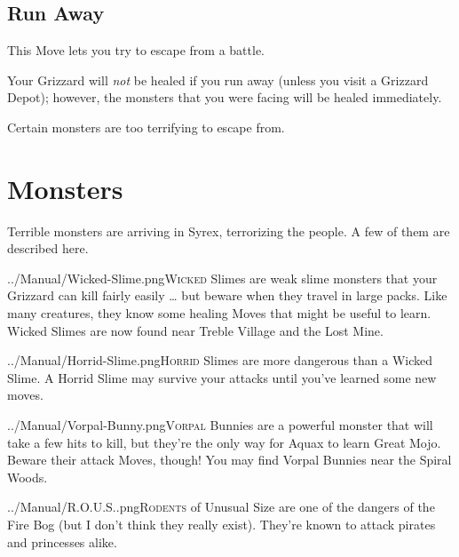 \documentclass[10pt,twocolumn,openany,article]{memoir}
\begin{document}
\begin{description}
\fi

\section{Run Away}

This Move lets you try to escape from a battle.

Your Grizzard  will \emph{not}  be healed  if you  run away  (unless you
visit a Grizzard Depot); however, the monsters that you were facing will
be healed immediately.

Certain monsters are too terrifying to escape from.


\chapter{Monsters}

Terrible monsters are  arriving in Syrex, terrorizing the  people. A few
of them are described here.

\vspace{14pt}

\lettrine[image=true,       lines=5, findent=3pt, nindent=3pt]{../Manual/Wicked-Slime.png}{Wicked}
Slimes are weak slime monsters that your Grizzard can kill fairly easily
… but beware when they travel  in large packs. Like many creatures, they
know some healing Moves that might be useful to learn. Wicked Slimes are
now found near Treble Village and the Lost Mine.

\vspace{14pt}

\lettrine[image=true,       lines=5, findent=3pt, nindent=3pt]{../Manual/Horrid-Slime.png}{Horrid}
Slimes  are more  dangerous  than a  Wicked Slime.  A  Horrid Slime  may
survive your attacks until you've learned some new moves.

\vspace{14pt}

\lettrine[image=true,       lines=5, findent=3pt, nindent=3pt]{../Manual/Vorpal-Bunny.png}{Vorpal}
Bunnies are a  powerful monster that will  take a few hits  to kill, but
they're the only way for Aquax  to learn Great Mojo. Beware their attack
Moves, though! You may find Vorpal Bunnies near the Spiral Woods.

\vspace{14pt}

\lettrine[image=true,    lines=5, findent=3pt, nindent=3pt]{../Manual/R.O.U.S..png}{Rodents}    of
Unusual Size are one  of the dangers of the Fire Bog  (but I don't think
they   really   exist).   They're    known   to   attack   pirates   and
princesses alike.


\end{description}
\end{document}
